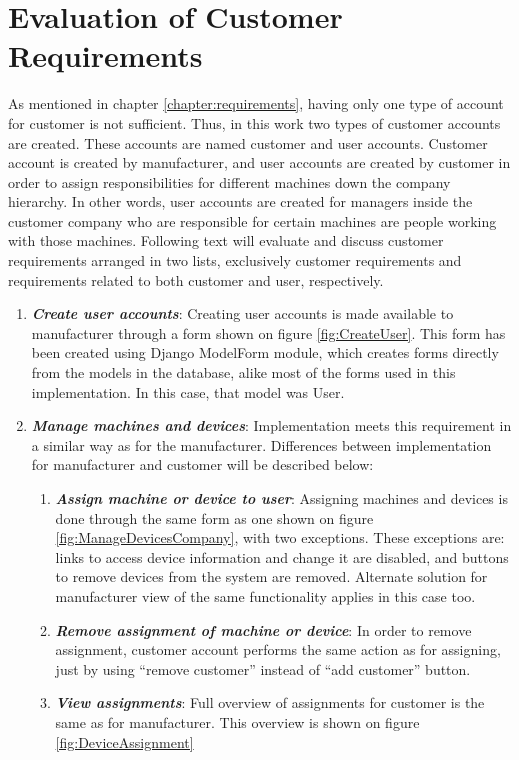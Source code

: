 \section{Evaluation of Customer Requirements}

As mentioned in chapter \ref{chapter:requirements}, having only one type of account for customer is not sufficient. Thus, in this work two types of customer accounts are created. These accounts are named customer and user accounts. Customer account is created by manufacturer, and user accounts are created by customer in order to assign responsibilities for different machines down the company hierarchy. In other words, user accounts are created for managers inside the customer company who are responsible for certain machines are people working with those machines. Following text will evaluate and discuss customer requirements arranged in two lists, exclusively customer requirements and requirements related to both customer and user, respectively.

\begin{enumerate}
	\setlength{\itemsep}{1pt}
	\item \textbf{\textit{Create user accounts}}: Creating user accounts is made available to manufacturer through a form shown on figure \ref{fig:CreateUser}. This form has been created using Django ModelForm module, which creates forms directly from the models in the database, alike most of the forms used in this implementation. In this case, that model was User.

	\item \textbf{\textit{Manage machines and devices}}: Implementation meets this requirement in a similar way as for the manufacturer. Differences between implementation for manufacturer and customer will be described below:

		\begin{enumerate}
			\item \textbf{\textit{Assign machine or device to user}}: Assigning machines and devices is done through the same form as one shown on figure \ref{fig:ManageDevicesCompany}, with two exceptions. These exceptions are: links to access device information and change it are disabled, and buttons to remove devices from the system are removed. Alternate solution for manufacturer view of the same functionality applies in this case too.

			\item \textbf{\textit{Remove assignment of machine or device}}: In order to remove assignment, customer account performs the same action as for assigning, just by using ``remove customer'' instead of ``add customer'' button.

			\item \textbf{\textit{View assignments}}: Full overview of assignments for customer is the same as for manufacturer. This overview is shown on figure \ref{fig:DeviceAssignment}
		\end{enumerate}
\end{enumerate}

